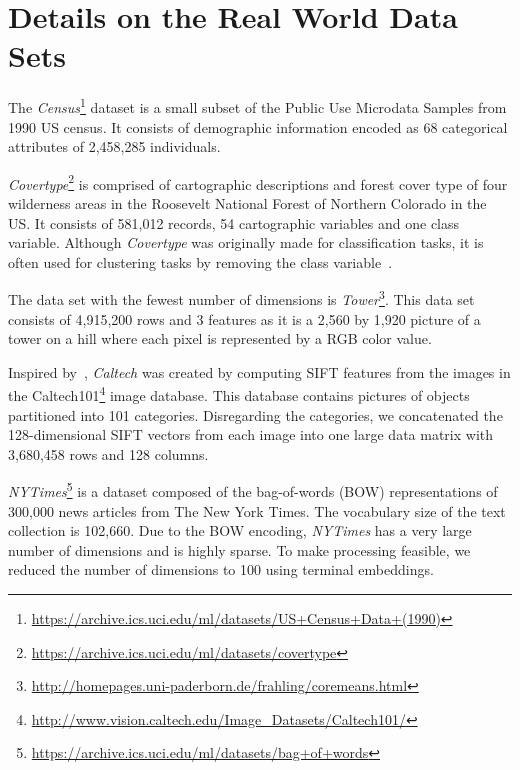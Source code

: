 \section{Details on the Real World Data Sets}
\label{sec:real-world-datasets-details}

The \textit{Census}\footnote{\url{https://archive.ics.uci.edu/ml/datasets/US+Census+Data+(1990)}} dataset is a small subset of the Public Use Microdata Samples from 1990 US census. It consists of demographic information encoded as 68 categorical attributes of 2,458,285 individuals. 

\textit{Covertype}\footnote{\url{https://archive.ics.uci.edu/ml/datasets/covertype}} is comprised of cartographic descriptions and forest cover type of four wilderness areas in the Roosevelt National Forest of Northern Colorado in the US. It consists of 581,012 records, 54 cartographic variables and one class variable. Although \textit{Covertype} was originally made for classification tasks, it is often used for clustering tasks by removing the class variable~\cite{AckermannMRSLS12}.

The data set with the fewest number of dimensions is \textit{Tower}\footnote{\url{http://homepages.uni-paderborn.de/frahling/coremeans.html}}. This data set consists of 4,915,200 rows and 3 features as it is a 2,560 by 1,920 picture of a tower on a hill where each pixel is represented by a RGB color value. 



Inspired by~\cite{FGSSS13}, \textit{Caltech} was created by computing SIFT features from the images in the Caltech101\footnote{\url{http://www.vision.caltech.edu/Image_Datasets/Caltech101/}} image database. This database contains pictures of objects partitioned into 101 categories. Disregarding the categories, we concatenated the 128-dimensional SIFT vectors from each image into one large data matrix with 3,680,458 rows and 128 columns. 

\textit{NYTimes}\footnote{\url{https://archive.ics.uci.edu/ml/datasets/bag+of+words}} is a dataset composed of the bag-of-words (BOW) representations of 300,000 news articles from The New York Times. The vocabulary size of the text collection is 102,660. Due to the BOW encoding, \textit{NYTimes} has a very large number of dimensions and is highly sparse. To make processing feasible, we reduced the number of dimensions to 100 using terminal embeddings.





